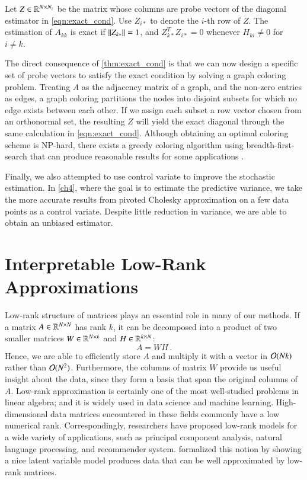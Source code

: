\begin{theorem}\label{thm:exact_cond}
Let $Z\in\mathbb{R}^{N\times N_z}$ be the matrix whose columns are probe vectors of
the diagonal estimator in \cref{eqn:exact_cond}. Use $Z_{i\ast}$ to denote the
$i$\hyp{}th row of $Z$. The estimation of $A_{kk}$ is exact if $\left\lVert Z_
{k\ast}\right\rVert = 1$, and $Z_{k\ast}^TZ_{i\ast} = 0$ whenever $H_{ki}\neq 0$ for $i\neq
k$.
\end{theorem}

The direct consequence of \cref{thm:exact_cond} is that we can now design a
specific set of probe vectors to satisfy the exact condition by solving a graph
coloring problem. Treating $A$ as the adjacency matrix of a graph, and the
non\hyp{}zero entries as edges, a graph coloring partitions the nodes into
disjoint subsets for which no edge exists between each other. If we assign each
subset a row vector chosen from an orthonormal set, the resulting $Z$ will yield
the exact diagonal through the same calculation in \cref{eqn:exact_cond}.
Although obtaining an optimal coloring scheme is NP\hyp{}hard, there exists a
greedy coloring algorithm using breadth\hyp{}first\hyp{}search that can produce
reasonable results for some applications \cite[Theorem~28.33]
{arumugam2016handbook}.

Finally, we also attempted to use control variate to improve the stochastic
estimation. In \cref{ch4}, where the goal is to estimate the predictive
variance, we take the more accurate results from pivoted Cholesky approximation
on a few data points as a control variate. Despite little reduction in variance,
we are able to obtain an unbiased estimator.

\section{Interpretable Low\hyp{}Rank Approximations}\label{pre:lra}

Low\hyp{}rank structure of matrices plays an essential role in many of our
methods. If a matrix $A\in\mathbb{R}^{N\times N}$ has rank $k$, it can be
decomposed into a product of two smaller matrices $W\in\mathbb{R}^{N\times k}$ and
$H\in\mathbb{R}^{k\times N}$:
\begin{equation}\label{eqn:low_rank}
A = WH\,.
\end{equation}
Hence, we are able to efficiently store $A$ and multiply it with a vector in
$\mathcal{O}(Nk)$ rather than $\mathcal{O}(N^2)$. Furthermore, the columns of matrix $W$
provide us useful insight about the data, since they form a basis that span the
original columns of $A$. Low\hyp{}rank approximation is certainly one of the
most well\hyp{}studied problems in linear algebra; and it is widely used in data
science and machine learning. High\hyp{}dimensional data matrices encountered in
these fields commonly have a low numerical rank. Correspondingly, researchers
have proposed low\hyp{}rank models for a wide variety of applications, such as
principal component analysis, natural language processing, and recommender
system. \citet{udell2019big} formalized this notion by showing a nice latent
variable model produces data that can be well approximated by low\hyp{}rank
matrices.

